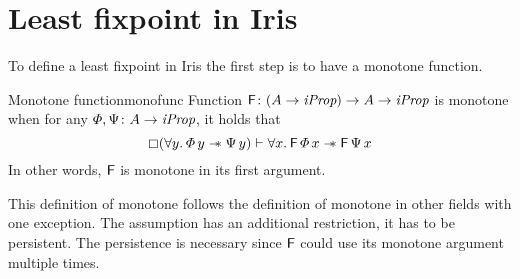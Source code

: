 \documentclass[thesis.tex]{subfiles}
\begin{document}
\section{Least fixpoint in Iris} \label{sec:fixIris}
To define a least fixpoint in Iris the first step is to have a monotone function.
\begin{definition}{Monotone function}{monofunc}
  Function $\textsf{\upshape F}\colon (A \to \textit{iProp}) \to  A \to \textit{iProp}$ is monotone when for any $\varPhi, \Psi\colon A \to \textit{iProp}$, it holds that
  \[ \always(\All \varB. \pred\,\varB \wand \predB\,\varB) \proves \All \var. \hopred\,\pred\,\var \wand \hopred\,\predB\,\var\]
  In other words, $\textsf{\upshape F}$ is monotone in its first argument.
\end{definition}
This definition of monotone follows the definition of monotone in other fields with one exception. The assumption has an additional restriction, it has to be persistent. The persistence is necessary since $\textsf{\upshape F}$ could use its monotone argument multiple times.
\end{document}
